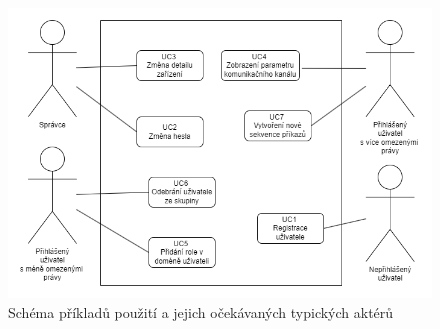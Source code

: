 \begin{figure}[h!]
    \centering
    \includegraphics[width=1\textwidth]{images/uc.png}
    \caption{Schéma příkladů použití a jejich očekávaných typických aktérů}
    \label{fig:my_label}
\end{figure}


